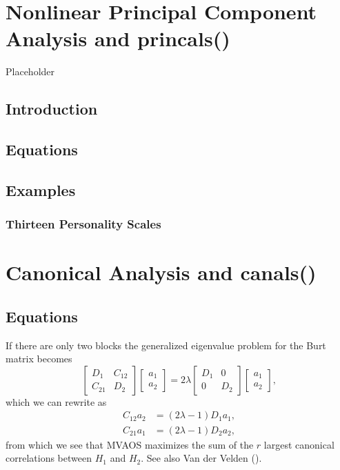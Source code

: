 \documentclass[
  12pt,
]{book}
\begin{document}
\chapter{Nonlinear Principal Component Analysis and princals()}\label{nonlinear-principal-component-analysis-and-princals}

Placeholder

\section{Introduction}\label{introduction-3}

\section{Equations}\label{equations-2}

\section{Examples}\label{examples-2}

\subsection{Thirteen Personality Scales}\label{thirteen-personality-scales-1}

\chapter{Canonical Analysis and canals()}\label{canonical-analysis-and-canals}

\section{Equations}\label{equations-3}

If there are only two blocks the generalized eigenvalue problem for the Burt matrix becomes
\[
\begin{bmatrix}
D_1&C_{12}\\C_{21}&D_2
\end{bmatrix}
\begin{bmatrix}
a_1\\a_2
\end{bmatrix}=2\lambda\begin{bmatrix}D_1&0\\0&D_2\end{bmatrix}\begin{bmatrix}
a_1\\a_2
\end{bmatrix},
\]
which we can rewrite as
\[
\begin{split}
C_{12}a_2&=(2\lambda-1)D_1a_1,\\
C_{21}a_1&=(2\lambda-1)D_2a_2,
\end{split}
\]
from which we see that MVAOS maximizes the sum of the \(r\) largest canonical correlations between \(H_1\) and \(H_2\). See also Van der Velden ().
\end{document}
